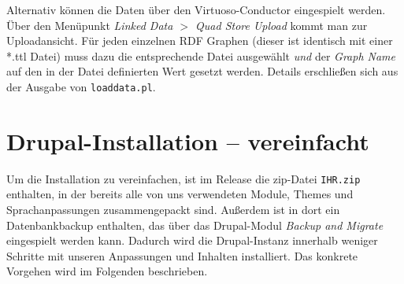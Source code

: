 \documentclass[a4paper,11pt,twoside]{article}
\begin{document}
Alternativ können die Daten über den Virtuoso-Conductor eingespielt werden.
Über den Menüpunkt \textit{Linked Data $>$ Quad Store Upload} kommt man zur
Uploadansicht.  Für jeden einzelnen RDF Graphen (dieser ist identisch mit einer
*.ttl Datei) muss dazu die entsprechende Datei ausgewählt \emph{und} der
\textit{Graph Name} auf den in der Datei definierten Wert gesetzt werden.
Details erschließen sich aus der Ausgabe von \texttt{loaddata.pl}.

\section{Drupal-Installation -- vereinfacht}
Um die Installation zu vereinfachen, ist im Release die zip-Datei
\texttt{IHR.zip} enthalten, in der bereits alle von uns verwendeten Module,
Themes und Sprachanpassungen zusammengepackt sind. Außerdem ist in dort ein
Datenbankbackup enthalten, das über das Drupal-Modul \emph{Backup and Migrate}
eingespielt werden kann.  Dadurch wird die Drupal-Instanz innerhalb weniger
Schritte mit unseren Anpassungen und Inhalten installiert. Das konkrete
Vorgehen wird im Folgenden beschrieben.
\end{document}
